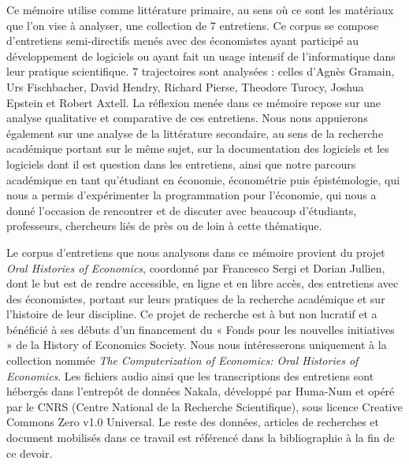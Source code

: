 
Ce mémoire utilise comme littérature primaire, au sens où ce sont les matériaux que l'on vise à analyser, une collection de 7 entretiens. Ce corpus se compose d’entretiens semi-directifs menés avec des économistes ayant participé au développement de logiciels ou ayant fait un usage intensif de l’informatique dans leur pratique scientifique. 7 trajectoires sont analysées : celles d’Agnès Gramain, Urs Fischbacher, David Hendry, Richard Pierse, Theodore Turocy, Joshua Epstein et Robert Axtell. La réflexion menée dans ce mémoire repose sur une analyse qualitative et comparative de ces entretiens. Nous nous appuierons également sur une analyse de la littérature secondaire, au sens de la recherche académique portant sur le même sujet, sur la documentation des logiciels et les logiciels dont il est question dans les entretiens, ainsi que notre parcours académique en tant qu'étudiant en économie, économétrie puis épistémologie, qui nous a permis d'expérimenter la programmation pour l'économie, qui nous a donné l'occasion de rencontrer et de discuter avec beaucoup d'étudiants, professeurs, chercheurs liés de près ou de loin à cette thématique.

Le corpus d'entretiens que nous analysons dans ce mémoire provient du projet \textit{Oral Histories of Economics}, coordonné par Francesco Sergi et Dorian Jullien, dont le but est de rendre accessible, en ligne et en libre accès, des entretiens avec des économistes, portant sur leurs pratiques de la recherche académique et sur l'histoire de leur discipline. Ce projet de recherche est à but non lucratif et a bénéficié à ses débuts d'un financement du « Fonds pour les nouvelles initiatives » de la History of Economics Society.
Nous nous intéresserons uniquement à la collection nommée \textit{The Computerization of Economics: Oral Histories of Economics}. Les fichiers audio ainsi que les transcriptions des entretiens sont hébergés dans l'entrepôt de données Nakala, développé par Huma-Num et opéré par le CNRS (Centre National de la Recherche Scientifique), sous licence Creative Commons Zero v1.0 Universal.
Le reste des données, articles de recherches et document mobilisés dans ce travail est référencé dans la bibliographie à la fin de ce devoir.

